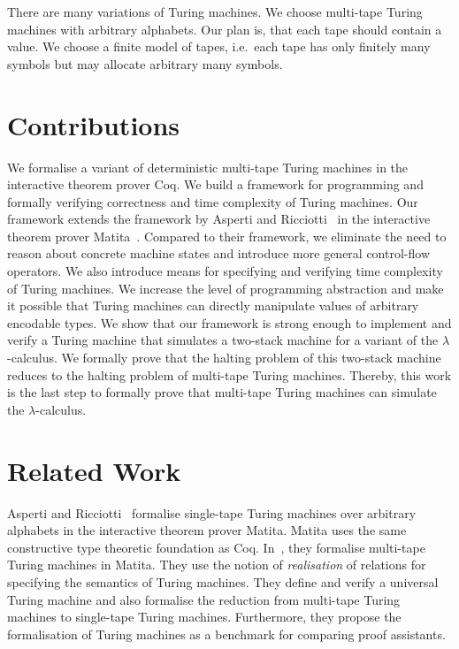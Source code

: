 There are many variations of Turing machines.  We choose multi-tape Turing machines with arbitrary alphabets.  Our plan is, that each tape should
contain a value.  We choose a finite model of tapes, i.e.\ each tape has only finitely many symbols but may allocate arbitrary many symbols.


\section{Contributions}
\label{sec:contributions}

We formalise a variant of deterministic multi-tape Turing machines in the interactive theorem prover Coq.  We build a framework for programming and
formally verifying correctness and time complexity of Turing machines.  Our framework extends the framework by Asperti and
Ricciotti~\cite{asperti2015} in the interactive theorem prover Matita~\cite{asperti2011matita}.  Compared to their framework, we eliminate the need to
reason about concrete machine states and introduce more general control-flow operators.  We also introduce means for specifying and verifying time
complexity of Turing machines.  We increase the level of programming abstraction and make it possible that Turing machines can directly manipulate
values of arbitrary encodable types.  We show that our framework is strong enough to implement and verify a Turing machine that simulates a two-stack
machine for a variant of the $\lambda$-calculus.  We formally prove that the halting problem of this two-stack machine reduces to the halting problem
of multi-tape Turing machines.  Thereby, this work is the last step to formally prove that multi-tape Turing machines can simulate the
$\lambda$-calculus.

\section{Related Work}
\label{sec:relatedwork}

Asperti and Ricciotti~\cite{asperti2012} formalise single-tape Turing machines over arbitrary alphabets in the interactive theorem prover Matita.
Matita uses the same constructive type theoretic foundation as Coq.  In~\cite{asperti2015}, they formalise multi-tape Turing machines in Matita.  They
use the notion of \textit{realisation} of relations for specifying the semantics of Turing machines.  They define and verify a universal Turing
machine and also formalise the reduction from multi-tape Turing machines to single-tape Turing machines.  Furthermore, they propose the formalisation
of Turing machines as a benchmark for comparing proof assistants.

